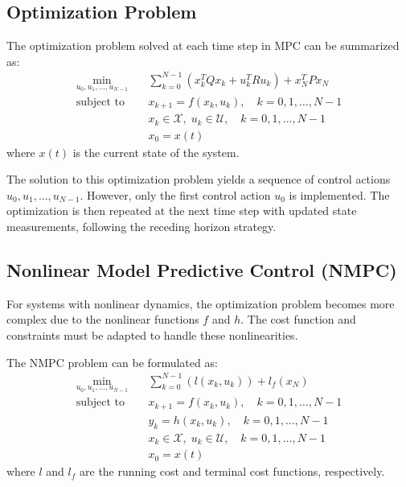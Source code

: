 \subsection*{Optimization Problem}
The optimization problem solved at each time step in MPC can be summarized as:
\[
\begin{aligned}
	\min_{u_{0}, u_{1}, \ldots, u_{N-1}} & \quad \sum_{k=0}^{N-1} \left( x_k^T Q x_k + u_k^T R u_k \right) + x_N^T P x_N \\
	\text{subject to} & \quad x_{k+1} = f(x_k, u_k), \quad k = 0, 1, \ldots, N-1 \\
	& \quad x_k \in \mathcal{X}, \; u_k \in \mathcal{U}, \quad k = 0, 1, \ldots, N-1 \\
	& \quad x_0 = x(t)
\end{aligned}
\]
where \(x(t)\) is the current state of the system.

The solution to this optimization problem yields a sequence of control actions \(u_0, u_1, \ldots, u_{N-1}\). However, only the first control action \(u_0\) is implemented. The optimization is then repeated at the next time step with updated state measurements, following the receding horizon strategy.

\subsection*{Nonlinear Model Predictive Control (NMPC)}
For systems with nonlinear dynamics, the optimization problem becomes more complex due to the nonlinear functions \(f\) and \(h\). The cost function and constraints must be adapted to handle these nonlinearities.

The NMPC problem can be formulated as:
\[
\begin{aligned}
	\min_{u_{0}, u_{1}, \ldots, u_{N-1}} & \quad \sum_{k=0}^{N-1} \left( l(x_k, u_k) \right) + l_f(x_N) \\
	\text{subject to} & \quad x_{k+1} = f(x_k, u_k), \quad k = 0, 1, \ldots, N-1 \\
	& \quad y_k = h(x_k, u_k), \quad k = 0, 1, \ldots, N-1 \\
	& \quad x_k \in \mathcal{X}, \; u_k \in \mathcal{U}, \quad k = 0, 1, \ldots, N-1 \\
	& \quad x_0 = x(t)
\end{aligned}
\]
where \(l\) and \(l_f\) are the running cost and terminal cost functions, respectively.

